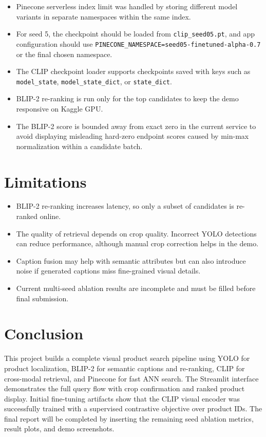 \documentclass[12pt, a4paper]{article}
\begin{document}
\begin{itemize}[leftmargin=*]
    \item Pinecone serverless index limit was handled by storing different model variants in separate namespaces within the same index.
    \item For seed 5, the checkpoint should be loaded from \texttt{clip\_seed05.pt}, and app configuration should use \texttt{PINECONE\_NAMESPACE=seed05-finetuned-alpha-0.7} or the final chosen namespace.
    \item The CLIP checkpoint loader supports checkpoints saved with keys such as \texttt{model\_state}, \texttt{model\_state\_dict}, or \texttt{state\_dict}.
    \item BLIP-2 re-ranking is run only for the top candidates to keep the demo responsive on Kaggle GPU.
    \item The BLIP-2 score is bounded away from exact zero in the current service to avoid displaying misleading hard-zero endpoint scores caused by min-max normalization within a candidate batch.
\end{itemize}

\section{Limitations}

\begin{itemize}[leftmargin=*]
    \item BLIP-2 re-ranking increases latency, so only a subset of candidates is re-ranked online.
    \item The quality of retrieval depends on crop quality. Incorrect YOLO detections can reduce performance, although manual crop correction helps in the demo.
    \item Caption fusion may help with semantic attributes but can also introduce noise if generated captions miss fine-grained visual details.
    \item Current multi-seed ablation results are incomplete and must be filled before final submission.
\end{itemize}

\section{Conclusion}

This project builds a complete visual product search pipeline using YOLO for product localization, BLIP-2 for semantic captions and re-ranking, CLIP for cross-modal retrieval, and Pinecone for fast ANN search. The Streamlit interface demonstrates the full query flow with crop confirmation and ranked product display. Initial fine-tuning artifacts show that the CLIP visual encoder was successfully trained with a supervised contrastive objective over product IDs. The final report will be completed by inserting the remaining seed ablation metrics, result plots, and demo screenshots.
\end{document}

